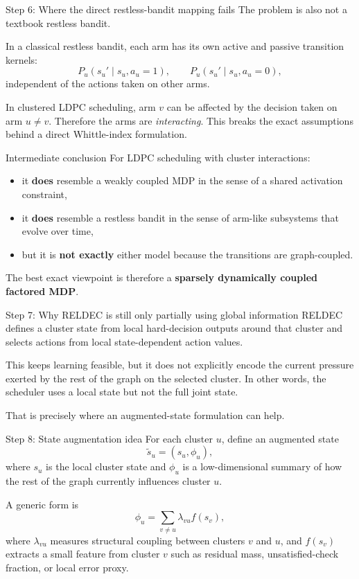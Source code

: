 \documentclass[aspectratio=169,professionalfonts]{beamer}
\begin{document}
\begin{frame}{Step 6: Where the direct restless-bandit mapping fails}
The problem is also not a textbook restless bandit.

\vspace{0.4em}
In a classical restless bandit, each arm has its own active and passive transition kernels:
\[
P_u(s_u'\mid s_u, a_u=1),
\qquad
P_u(s_u'\mid s_u, a_u=0),
\]
independent of the actions taken on other arms.

\vspace{0.4em}
In clustered LDPC scheduling, arm $v$ can be affected by the decision taken on arm $u \neq v$. Therefore the arms are \emph{interacting}. This breaks the exact assumptions behind a direct Whittle-index formulation.
\end{frame}

\begin{frame}{Intermediate conclusion}
For LDPC scheduling with cluster interactions:
\begin{itemize}
  \item it \textbf{does} resemble a weakly coupled MDP in the sense of a shared activation constraint,
  \item it \textbf{does} resemble a restless bandit in the sense of arm-like subsystems that evolve over time,
  \item but it is \textbf{not exactly} either model because the transitions are graph-coupled.
\end{itemize}
The best exact viewpoint is therefore a \textbf{sparsely dynamically coupled factored MDP}.
\end{frame}

\begin{frame}{Step 7: Why RELDEC is still only partially using global information}
RELDEC defines a cluster state from local hard-decision outputs around that cluster and selects actions from local state-dependent action values.

\vspace{0.4em}
This keeps learning feasible, but it does not explicitly encode the current pressure exerted by the rest of the graph on the selected cluster. In other words, the scheduler uses a local state but not the full joint state.

\vspace{0.4em}
That is precisely where an augmented-state formulation can help.
\end{frame}

\begin{frame}{Step 8: State augmentation idea}
For each cluster $u$, define an augmented state
\[
\tilde s_u = (s_u, \phi_u),
\]
where $s_u$ is the local cluster state and $\phi_u$ is a low-dimensional summary of how the rest of the graph currently influences cluster $u$.

\vspace{0.4em}
A generic form is
\[
\phi_u = \sum_{v\neq u} \lambda_{vu} f(s_v),
\]
where $\lambda_{vu}$ measures structural coupling between clusters $v$ and $u$, and $f(s_v)$ extracts a small feature from cluster $v$ such as residual mass, unsatisfied-check fraction, or local error proxy.
\end{frame}
\end{document}
